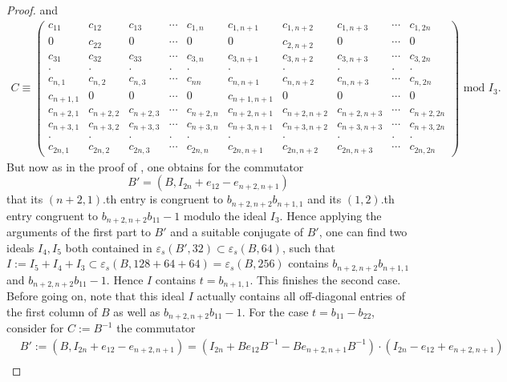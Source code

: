\documentclass[12pt]{amsart}
\theoremstyle{definition}\newtheorem{definition}[theorem]{Definition}
\theoremstyle{remark}\newtheorem{remark}[theorem]{Remark}
\theoremstyle{definition}\newtheorem{case}{Case}
\begin{document}
\begin{proof}
and
\begin{align*}
C\equiv 
\begin{pmatrix}
c_{11} & c_{12} & c_{13} & \cdots & c_{1,n} & c_{1,n+1} & c_{1,n+2} & c_{1,n+3} & \cdots & c_{1,2n}\\
0 & c_{22} & 0 & \cdots & 0 & 0 & c_{2,n+2} & 0 & \cdots & 0\\
c_{31} & c_{32} & c_{33} & \cdots & c_{3,n} & c_{3,n+1} & c_{3,n+2} & c_{3,n+3} & \cdots & c_{3,2n}\\
\cdot & \cdot & \cdot & \cdot & \cdot & \cdot & \cdot & \cdot & \cdot & \cdot\\
c_{n,1} & c_{n,2} & c_{n,3} & \cdots & c_{nn} & c_{n,n+1} & c_{n,n+2} & c_{n,n+3} & \cdots & c_{n,2n}\\
c_{n+1,1} & 0 & 0 & \cdots & 0 & c_{n+1,n+1} & 0 & 0 & \cdots & 0\\
c_{n+2,1} & c_{n+2,2} & c_{n+2,3} & \cdots & c_{n+2,n} & c_{n+2,n+1} & c_{n+2,n+2} & c_{n+2,n+3} & \cdots & c_{n+2,2n}\\
c_{n+3,1} & c_{n+3,2} & c_{n+3,3} & \cdots & c_{n+3,n} & c_{n+3,n+1} & c_{n+3,n+2} & c_{n+3,n+3} & \cdots & c_{n+3,2n}\\
\cdot & \cdot & \cdot & \cdot & \cdot & \cdot & \cdot & \cdot & \cdot & \cdot\\
c_{2n,1} & c_{2n,2} & c_{2n,3} & \cdots & c_{2n,n} & c_{2n,n+1} & c_{2n,n+2} & c_{2n,n+3} & \cdots & c_{2n,2n}
\end{pmatrix}\text{ mod }I_3.
\end{align*}
But now as in the proof of \cite[Theorem~2.3]{explicit_strong_bound_sp_2n}, one obtains for the commutator
\[
B'=(B,I_{2n}+e_{12}-e_{n+2,n+1})
\]
that its $(n+2,1).$th entry is congruent to $b_{n+2,n+2}b_{n+1,1}$ and its $(1,2).$th entry congruent to $b_{n+2,n+2}b_{11}-1$ modulo the ideal $I_3.$ Hence applying the arguments of the first part to $B'$ and a suitable conjugate of $B'$, one can find two ideals $I_4,I_5$ both contained in $\varepsilon_s(B',32)\subset\varepsilon_s(B,64)$, such that $I:=I_5+I_4+I_3\subset\varepsilon_s(B,128+64+64)=\varepsilon_s(B,256)$ contains $b_{n+2,n+2}b_{n+1,1}$ and $b_{n+2,n+2}b_{11}-1$. Hence $I$ contains $t=b_{n+1,1}.$ This finishes the second case. Before going on, note that this ideal $I$ actually contains all off-diagonal entries of the first column of $B$ as well as $b_{n+2,n+2}b_{11}-1.$ For the case $t=b_{11}-b_{22}$, consider for $C:=B^{-1}$ the commutator
\begin{align*}
&B':=\left(B,I_{2n}+e_{12}-e_{n+2,n+1}\right)=(I_{2n}+Be_{12}B^{-1}-Be_{n+2,n+1}B^{-1})\cdot (I_{2n}-e_{12}+e_{n+2,n+1})\\

\end{align*}
\end{proof}
\end{document}
